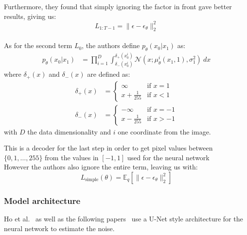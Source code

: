 \documentclass[twoside]{article}
\numberwithin{equation}{section}
\numberwithin{figure}{section}
\begin{document}
Furthermore, they found that simply ignoring the factor in front gave better results, giving us:
\begin{equation}
  L_{1:T-1} = \| \epsilon - \epsilon_\theta \|_2^2
\end{equation}
\\
As for the second term $L_0$, the authors define $p_\theta(x_0 | x_1)$ as:
\begin{align}
  p_\theta(x_0 | x_1) &= \prod_{i=1}^{D} \int_{\delta_{-} (x_0^i)}^{\delta_{+} (x_0^i)} \mathcal{N}(x; \mu_\theta^i (x_1, 1), \sigma^2_1) \: dx
\end{align}
\hspace{0.5cm} where $\delta_{+} (x)$ and $\delta_{-} (x)$ are defined as:
\begin{align}
  \delta_{+} (x) &= \begin{cases}
    \infty & \text{if } x = 1 \\
    x + \frac{1}{255} & \text{if } x < 1 
  \end{cases}\\
  \delta_{-} (x) &= \begin{cases}
    - \infty & \text{if } x = - 1 \\
    x - \frac{1}{255} & \text{if } x > -1 
  \end{cases}
\end{align}
\hspace{0.5cm} with $D$ the data dimensionality and $i$ one coordinate from the image.

This is a decoder for the last step in order to get pixel values between $\{0, 1, \dots, 255 \}$ from the values in $[-1, 1]$ used for the neural network~\cite{ho2020denoising,nichol2021improved} \\
However the authors also ignore the entire term, leaving us with:
\begin{equation}
  L_{\text{simple}}(\theta) = \mathbb{E}_q \left[ \| \epsilon - \epsilon_\theta \|_2^2 \right] \label{eq:l_simple}
\end{equation}

\subsubsection{Model architecture}\label{subsubsec:model_architecture}
Ho et al.~\cite{ho2020denoising} as well as the following papers~\cite{dhariwal2021diffusion, nichol2021improved, song2022denoising} use a U-Net style architecture for the neural network to estimate the noise. 
\end{document}
